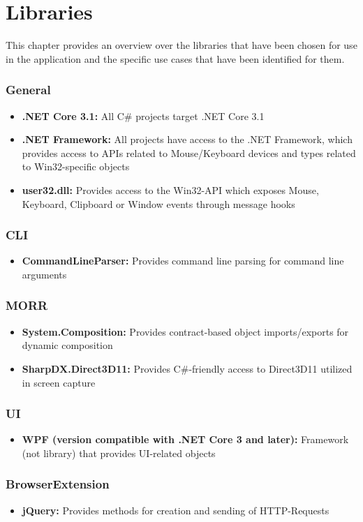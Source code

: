 \chapter{Libraries}
\label{ch:libraries}

\newcommand{\lib}[2]{\item{\textbf{#1: }{#2}}}

This chapter provides an overview over the libraries that have been chosen for use in the application and the specific use cases that have been identified for them.

\subsection*{General}

\begin{itemize}
    \lib{.NET Core 3.1}{All C\# projects target .NET Core 3.1}
    \lib{.NET Framework}{All projects have access to the .NET Framework, which provides access to APIs related to Mouse/Keyboard devices and types related to Win32-specific objects}
    \lib{user32.dll}{Provides access to the Win32-API which exposes Mouse, Keyboard, Clipboard or Window events through message hooks}
\end{itemize}

\subsection*{CLI}

\begin{itemize}
    \lib{CommandLineParser}{Provides command line parsing for command line arguments}
\end{itemize}

\subsection*{MORR}

\begin{itemize}
    \lib{System.Composition}{Provides contract-based object imports/exports for dynamic composition}
    \lib{SharpDX.Direct3D11}{Provides C\#-friendly access to Direct3D11 utilized in screen capture}
\end{itemize}

\subsection*{UI}

\begin{itemize}
    \lib{WPF (version compatible with .NET Core 3 and later)}{Framework (not library) that provides UI-related objects}
\end{itemize}

\subsection*{BrowserExtension}

\begin{itemize}
    \lib{jQuery}{Provides methods for creation and sending of HTTP-Requests}
\end{itemize}